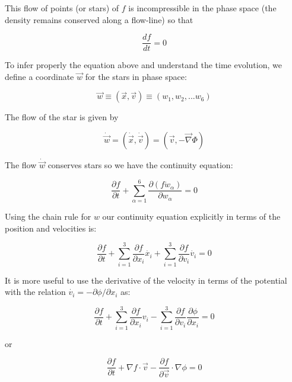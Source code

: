 This flow of points (or stars) of $f$ is incompressible in the phase space (the density remains conserved along a flow-line) so that

\begin{equation}
\frac{df}{dt}=0
\end{equation}

To infer properly the equation above and understand the time evolution, we define a coordinate $\vec{w}$ for the stars in phase space:

\begin{equation}
\vec{w}\equiv (\vec{x},\vec{v})\equiv (w_{1},w_{2},...w_{6})
\end{equation}

The flow of the star is given by 

\begin{equation}
\dot{\vec{w}}= (\dot{\vec{x}},\dot{\vec{v}})=(\vec{v},-\vec{\nabla} \Phi)
\end{equation}

The flow $\dot{\vec{w}}$ conserves stars so we have the continuity equation:

\begin{equation}
\frac{\partial f}{\partial t}+\sum_{\alpha=1}^{6}\frac{\partial (f\dot{w}_{\alpha})}{\partial w_{\alpha}}=0
\end{equation}

Using the chain rule for $w$ our continuity equation explicitly in terms of the position and velocities is:

\begin{equation}
\frac{\partial f}{\partial t}+\sum_{i=1}^{3}\frac{\partial f}{\partial x_{i}}\dot{x_{i}}+\sum_{i=1}^{3}\frac{\partial f}{\partial v_{i}}\dot{v_{i}}=0
\end{equation}

It is more useful to use the derivative of the velocity in terms of the potential with the relation $\dot{v_{i}}=-\partial\phi / \partial x_{i}$ as:

\begin{equation}
\frac{\partial f}{\partial t}+\sum_{i=1}^{3}\frac{\partial f}{\partial x_{i}}v_{i}-\sum_{i=1}^{3}\frac{\partial f}{\partial v_{i}}\frac{\partial\phi}{\partial x_{i}}=0
\end{equation}

or

\begin{equation}
\frac{\partial f}{\partial t}+\nabla f\cdot\vec{v}-\frac{\partial f}{\partial\overrightarrow{v}}\cdot\nabla\phi=0
\end{equation}

